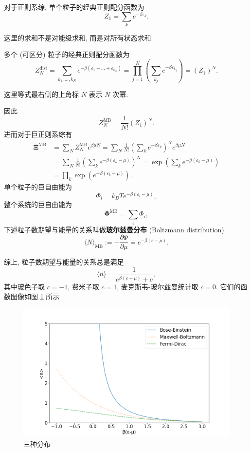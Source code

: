 对于正则系综, 单个粒子的经典正则配分函数为
\[ Z_1=\sum_ke^{-\beta\varepsilon_k}. \]
\begin{remark}
    这里的求和不是对能级求和, 而是对所有状态求和.
\end{remark}
多个 (可区分) 粒子的经典正则配分函数为
\[ Z^{\mathrm{dist}}_N=\sum_{k_1,\dots,k_N}e^{-\beta(\varepsilon_1+\dots+\varepsilon_{k_N})}=\prod_{j=1}^{N}\left( \sum_{k_j}e^{-\beta\varepsilon_{k_j}} \right)=(Z_1)^N. \]
\begin{remark}
    这里等式最右侧的上角标 $N$ 表示 $N$ 次幂.
\end{remark}
因此
\[ Z^{\mathrm{MB}}_N=\frac{1}{N!}(Z_1)^N. \]
进而对于巨正则系综有
\begin{align*}
    \bm\Xi^{\mathrm{MB}} &= \sum_N Z^{\mathrm{MB}}_Ne^{\beta\mu N}=\sum_N\frac{1}{N!}\left( \sum_{k}e^{-\beta\varepsilon_k} \right)^Ne^{\beta\mu N}\\ 
    &=\sum_N\frac{1}{N!}\left( \sum_k e^{-\beta(\varepsilon_k-\mu)} \right)^N=\exp\left( \sum_k e^{-\beta(\varepsilon_k-\mu)} \right)\\
    &=\prod_k\exp\left( e^{-\beta(\varepsilon_k-\mu)} \right).
\end{align*}
单个粒子的巨自由能为
\[ \Phi_i=k_BTe^{-\beta(\varepsilon_i-\mu)}, \]
整个系统的巨自由能为
\[ \bm\Phi^{\mathrm{MB}}=\sum_i \Phi_i, \]
下述粒子数期望与能量的关系叫做{\bf 玻尔兹曼分布} (Boltzmann distribution)
\[ \langle N\rangle_{\mathrm{MB}}:=-\frac{\partial\Phi}{\partial\mu}=e^{-\beta(\varepsilon-\mu)}. \]

综上, 粒子数期望与能量的关系总是满足
\[ \langle n\rangle=\frac{1}{e^{\beta(\varepsilon-\mu)}+c}, \]
其中玻色子取 $ c=-1 $, 费米子取 $ c=1 $, 麦克斯韦-玻尔兹曼统计取 $ c=0 $. 它们的函数图像如图 \ref{quantum statistical} 所示
\begin{figure}[htbp]
    \centering
    \includegraphics[width=\textwidth]{pic/quantum statistical.png}
    \caption{三种分布}
    \label{quantum statistical}
\end{figure}


